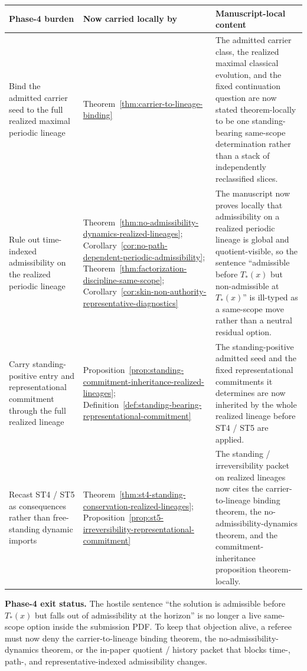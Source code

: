 \begin{center}
\footnotesize
\renewcommand{\arraystretch}{1.16}
\setlength{\tabcolsep}{4pt}
\begin{tabularx}{0.98\textwidth}{@{}L{0.31\textwidth}L{0.24\textwidth}Y@{}}
\toprule
\textbf{Phase-4 burden} & \textbf{Now carried locally by} & \textbf{Manuscript-local content}\\
\midrule
Bind the admitted carrier seed to the full realized maximal periodic lineage & Theorem~\ref{thm:carrier-to-lineage-binding} & The admitted carrier class, the realized maximal classical evolution, and the fixed continuation question are now stated theorem-locally to be one standing-bearing same-scope determination rather than a stack of independently reclassified slices.\\
Rule out time-indexed admissibility on the realized periodic lineage & Theorem~\ref{thm:no-admissibility-dynamics-realized-lineages}; Corollary~\ref{cor:no-path-dependent-periodic-admissibility}; Theorem~\ref{thm:factorization-discipline-same-scope}; Corollary~\ref{cor:skin-non-authority-representative-diagnostics} & The manuscript now proves locally that admissibility on a realized periodic lineage is global and quotient-visible, so the sentence ``admissible before $T_*(x)$ but non-admissible at $T_*(x)$'' is ill-typed as a same-scope move rather than a neutral residual option.\\
Carry standing-positive entry and representational commitment through the full realized lineage & Proposition~\ref{prop:standing-commitment-inheritance-realized-lineages}; Definition~\ref{def:standing-bearing-representational-commitment} & The standing-positive admitted seed and the fixed representational commitments it determines are now inherited by the whole realized lineage before ST4 / ST5 are applied.\\
Recast ST4 / ST5 as consequences rather than free-standing dynamic imports & Theorem~\ref{thm:st4-standing-conservation-realized-lineages}; Proposition~\ref{prop:st5-irreversibility-representational-commitment} & The standing / irreversibility packet on realized lineages now cites the carrier-to-lineage binding theorem, the no-admissibility-dynamics theorem, and the commitment-inheritance proposition theorem-locally.\\
\bottomrule
\end{tabularx}
\end{center}

\noindent\textbf{Phase-4 exit status.} The hostile sentence ``the solution is admissible before $T_*(x)$ but falls out of admissibility at the horizon'' is no longer a live same-scope option inside the submission PDF. To keep that objection alive, a referee must now deny the carrier-to-lineage binding theorem, the no-admissibility-dynamics theorem, or the in-paper quotient / history packet that blocks time-, path-, and representative-indexed admissibility changes.

